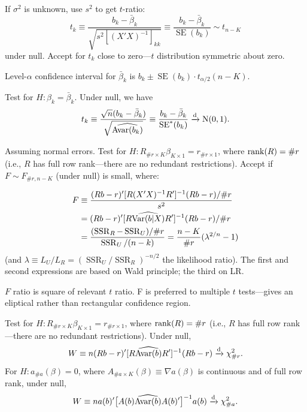 \documentclass[8pt,letterpaper, landscape]{extarticle} %
\begin{document}
\begin{multicols}{3}
\begin{description}
If $ \sigma^2 $ is unknown, use $ s^2 $ to get $ t $-ratio:
$$ t_k \equiv \frac{b_k - \bar{\beta}_k}{\sqrt{ s^2 [(X'X)^{-1}]_{kk} }} \equiv
\frac{b_k - \bar{\beta}_k}{\operatorname{SE}(b_k)}
\sim t_{n-K} $$
under null. Accept for $ t_k $ close to zero---$ t $ distribution symmetric about zero.

Level-$ \alpha $ confidence interval for $ \bar{\beta}_k $ is $ b_k \pm \operatorname{SE}(b_k) \cdot t_{\alpha / 2} (n-K) $.

 Test for $ H \colon \beta_k = \bar{\beta}_k $. Under null, we have
$$ t_k \equiv \frac{\sqrt{n} (b_k - \bar{\beta}_k)}{\sqrt{ \widehat{\operatorname{Avar} (b_k)} }} \equiv
\frac{b_k - \bar{\beta}_k}{\operatorname{SE}^*(b_k)} \xrightarrow{\text{d}} \operatorname{N} (0,1). $$

 Assuming normal errors. Test for $ H \colon R_{\# r \times K} \beta_{K \times 1} = r_{\# r \times 1} $, where $ \operatorname{rank} (R) = \# r $ (i.e., $ R $ has full row rank---there are no redundant restrictions). Accept if $ F \sim F_{\# r, n-K} $ (under null) is small, where:

\begin{align*}
F &\equiv \frac{(Rb - r)' [R(X'X)^{-1}R']^{-1} (Rb - r) / \# r}{s^2} \\
&= (Rb - r)' [R \widehat{\operatorname{Var} (b|X) } R']^{-1} (Rb - r) / \# r \\
&= \frac{ (\operatorname{SSR}_R - \operatorname{SSR}_U ) / \# r }{\operatorname{SSR}_U / (n-k)} = \frac{n-K}{\# r} (\lambda^{2/n} - 1)
\end{align*}
(and $ \lambda \equiv L_U / L_R = (\operatorname{SSR}_U / \operatorname{SSR}_R)^{-n/2} $ the likelihood ratio). The first and second expressions are based on Wald principle; the third on LR.

$ F $ ratio is square of relevant $ t $ ratio. F is preferred to multiple $ t $ tests---gives an eliptical rather than rectangular confidence region.

 Test for $ H \colon R_{\# r \times K} \beta_{K \times 1} = r_{\# r \times 1} $, where $ \operatorname{rank} (R) = \# r $ (i.e., $ R $ has full row rank---there are no redundant restrictions). Under null,
$$ W \equiv n (Rb - r)' [R \widehat{\operatorname{Avar} (b)} R']^{-1} (Rb - r) \xrightarrow{\text{d}} \chi^2_{\# r}.$$
For $ H \colon a_{\# a} (\beta) = 0 $, where $ A_{\# a \times K} (\beta) \equiv \nabla a (\beta) $ is continuous and of full row rank, under null,
$$ W \equiv n a(b)' \big [ A(b) \widehat{\operatorname{Avar} (b)} A(b)' \big ]^{-1}
a(b) \xrightarrow{\text{d}} \chi^{2}_{\# a}. $$


\end{description}
\end{multicols}
\end{document}
